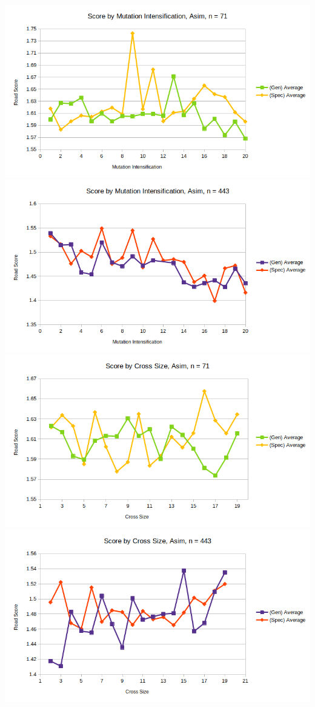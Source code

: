 \documentclass{article}
\begin{document}
\includegraphics[scale=0.36]{mIAsim71}
\includegraphics[scale=0.36]{mIAsim443}
\includegraphics[scale=0.36]{cSAsim71}
\includegraphics[scale=0.36]{cSAsim443}
\end{document}
